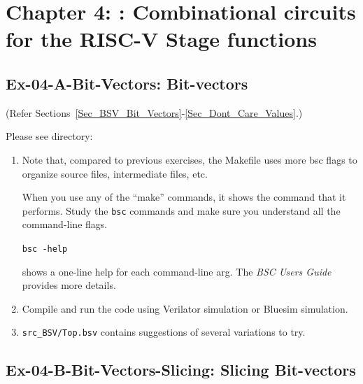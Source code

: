 
\hdivider

\section*{Chapter 4: {\BSV}: Combinational circuits for the RISC-V Stage functions}


\subsection*{Ex-04-A-Bit-Vectors: Bit-vectors}
\label{Ex-04-A-Bit-Vectors}

(Refer Sections~\ref{Sec_BSV_Bit_Vectors}-\ref{Sec_Dont_Care_Values}.)

Please see directory: 

\begin{enumerate}

  \item Note that, compared to previous exercises, the Makefile uses
    more bsc flags to organize source files, intermediate files, etc.

    When you use any of the ``make'' commands, it shows the {\bsc}
    command that it performs.  Study the {\tt bsc} commands and make
    sure you understand all the command-line flags.

    \hm \verb|bsc -help|

    shows a one-line help for each command-line arg.  The \emph{BSC
    Users Guide} provides more details.

  \item Compile and run the code using Verilator simulation or Bluesim
    simulation.

  \item \verb|src_BSV/Top.bsv| contains suggestions of several variations to try.

\end{enumerate}


\subsection*{Ex-04-B-Bit-Vectors-Slicing: Slicing Bit-vectors}
\label{Ex-04-B-Bit-Vectors-Slicing}


